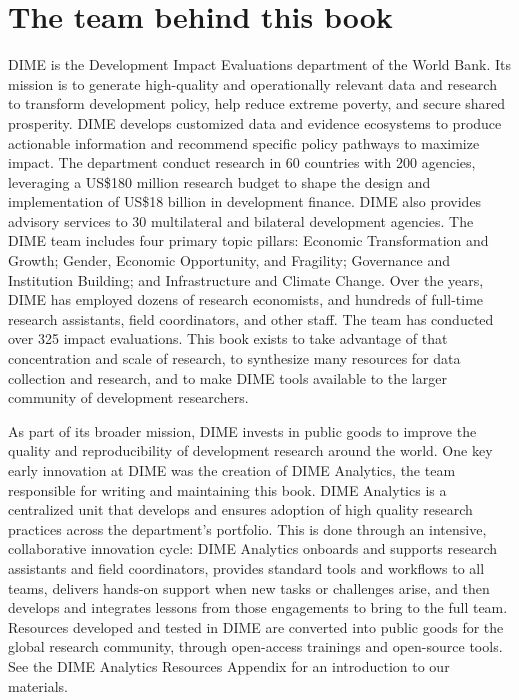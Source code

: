\section{The team behind this book}
DIME is the Development Impact Evaluations department of the World Bank.
Its mission is to generate high-quality and operationally relevant data and research
to transform development policy, help reduce extreme poverty, and secure shared prosperity.\cite{legovini2015impact}
DIME develops customized data and evidence ecosystems to produce actionable information
and recommend specific policy pathways to maximize impact.
The department conduct research in 60 countries with 200 agencies, leveraging a
US\$180 million research budget to shape the design and implementation of
US\$18 billion in development finance.
DIME also provides advisory services to 30 multilateral and bilateral development agencies.\cite{legovini2019}
The DIME team includes four primary topic pillars:
Economic Transformation and Growth;
Gender, Economic Opportunity, and Fragility;
Governance and Institution Building;
and Infrastructure and Climate Change.
Over the years, DIME has employed dozens of research economists,
and hundreds of full-time research assistants, field coordinators, and other staff.
The team has conducted over 325 impact evaluations.
This book exists to take advantage of that concentration and scale of research,
to synthesize many resources for data collection and research,
and to make DIME tools available to the larger community of development researchers.

As part of its broader mission, DIME invests in public goods
to improve the quality and reproducibility of development research around the world.
One key early innovation at DIME was the creation of DIME Analytics,
the team responsible for writing and maintaining this book.
DIME Analytics is a centralized unit that develops and ensures adoption
of high quality research practices across the department's portfolio.
This is done through an intensive, collaborative innovation cycle:
DIME Analytics onboards and supports research assistants and field coordinators,
provides standard tools and workflows to all teams,
delivers hands-on support when new tasks or challenges arise,
and then develops and integrates lessons from those engagements to bring to the full team.
Resources developed and tested in DIME are converted into public goods
for the global research community, through open-access trainings and open-source tools.
See the DIME Analytics Resources Appendix for an introduction to our materials.

